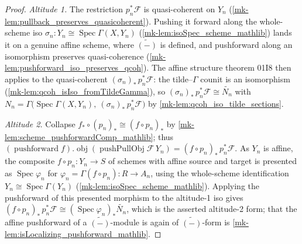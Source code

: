 \begin{proof}
  \emph{Altitude 1.} The restriction \(p_n^*\mathcal{F}\) is quasi-coherent on \(Y_n\)
  (\ref{mk-lem:pullback_preserves_quasicoherent}). Pushing it forward along the whole-scheme
  iso \(\sigma_n : Y_n \cong \operatorname{Spec}\Gamma(X, Y_n)\) (\ref{mk-lem:isoSpec_scheme_mathlib})
  lands it on a genuine affine scheme, where \(\widetilde{(-)}\) is defined, and pushforward
  along an isomorphism preserves quasi-coherence (\ref{mk-lem:pushforward_iso_preserves_qcoh}).
  The affine structure theorem 01I8 then applies to the quasi-coherent
  \((\sigma_n)_*\,p_n^*\mathcal{F}\): the tilde--\(\Gamma\) counit is an isomorphism
  (\ref{mk-lem:qcoh_isIso_fromTildeGamma}), so
  \((\sigma_n)_*\,p_n^*\mathcal{F} \cong \widetilde{N_n}\) with
  \(N_n = \Gamma\bigl(\operatorname{Spec}\Gamma(X, Y_n),\ (\sigma_n)_*\,p_n^*\mathcal{F}\bigr)\)
  by \ref{mk-lem:qcoh_iso_tilde_sections}.

  \emph{Altitude 2.} Collapse \(f_* \circ (p_n)_* \cong (f \circ p_n)_*\) by
  \ref{mk-lem:scheme_pushforwardComp_mathlib}; thus
  \((\operatorname{pushforward} f).\operatorname{obj}(\operatorname{pushPullObj}\mathcal{F}\,
  Y_n) = (f \circ p_n)_*\,p_n^*\mathcal{F}\). As \(Y_n\) is affine, the composite
  \(f \circ p_n : Y_n \to S\) of schemes with affine source and target is presented as
  \(\operatorname{Spec}\varphi_n\) for \(\varphi_n = \Gamma(f \circ p_n) : R \to A_n\),
  using the whole-scheme identification \(Y_n \cong \operatorname{Spec}\Gamma(Y_n)\)
  (\ref{mk-lem:isoSpec_scheme_mathlib}). Applying the
  pushforward of this presented morphism to the altitude-1 iso gives
  \((f \circ p_n)_*\,p_n^*\mathcal{F} \cong (\operatorname{Spec}\varphi_n)_*\widetilde{N_n}\),
  which is the asserted altitude-2 form; that the affine pushforward of a
  \(\widetilde{(-)}\)-module is again of \(\widetilde{(-)}\)-form
  is \ref{mk-lem:isLocalizing_pushforward_mathlib}.
\end{proof}

